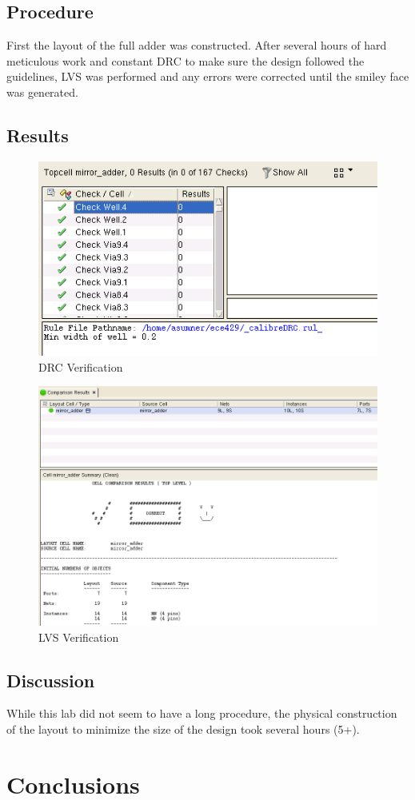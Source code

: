 \documentclass[12pt]{article}
\begin{document}
\subsection{Procedure}
First the layout of the full adder was constructed. After several hours of hard meticulous work and constant DRC to make sure the design followed the guidelines, LVS was performed and any errors were corrected until the smiley face was generated. 
\subsection{Results}
\begin{figure}[H]
\centering
\includegraphics[width=1\linewidth]{drc}
\caption{DRC Verification}
\label{fig:drc}
\end{figure}

\begin{figure}[H]
\centering
\includegraphics[width=1\linewidth]{lvs}
\caption{LVS Verification}
\label{fig:lvs}
\end{figure}



\subsection{Discussion}
While this lab did not seem to have a long procedure, the physical construction of the layout to minimize the size of the design took several hours (5+).
\section{Conclusions}
\end{document}
